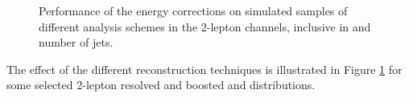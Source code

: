 \begin{figure}[!htpb]
    \centering
    \caption{Performance of the energy corrections on simulated samples of different analysis schemes in the 2-lepton channels, inclusive in \ptv and number of jets.}
    \label{fig:CorrResults}
\end{figure}

The effect of the different reconstruction techniques is illustrated in Figure \ref{fig:CorrResults} for some selected 2-lepton resolved and boosted \vhb and \vhc distributions.